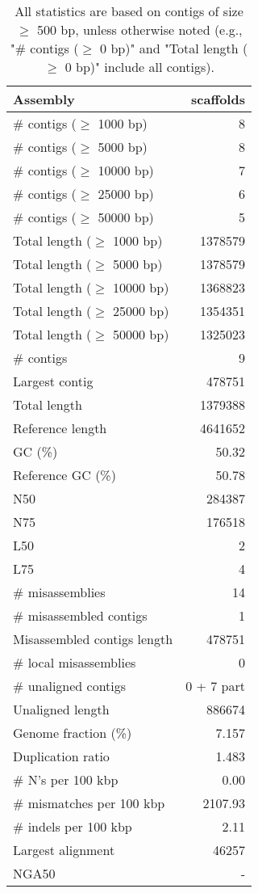 \documentclass[12pt,a4paper]{article}
\begin{document}
\begin{table}[ht]
\begin{center}
\caption{All statistics are based on contigs of size $\geq$ 500 bp, unless otherwise noted (e.g., "\# contigs ($\geq$ 0 bp)" and "Total length ($\geq$ 0 bp)" include all contigs).}
\begin{tabular}{|l*{1}{|r}|}
\hline
Assembly & scaffolds \\ \hline
\# contigs ($\geq$ 1000 bp) & 8 \\ \hline
\# contigs ($\geq$ 5000 bp) & 8 \\ \hline
\# contigs ($\geq$ 10000 bp) & 7 \\ \hline
\# contigs ($\geq$ 25000 bp) & 6 \\ \hline
\# contigs ($\geq$ 50000 bp) & 5 \\ \hline
Total length ($\geq$ 1000 bp) & 1378579 \\ \hline
Total length ($\geq$ 5000 bp) & 1378579 \\ \hline
Total length ($\geq$ 10000 bp) & 1368823 \\ \hline
Total length ($\geq$ 25000 bp) & 1354351 \\ \hline
Total length ($\geq$ 50000 bp) & 1325023 \\ \hline
\# contigs & 9 \\ \hline
Largest contig & 478751 \\ \hline
Total length & 1379388 \\ \hline
Reference length & 4641652 \\ \hline
GC (\%) & 50.32 \\ \hline
Reference GC (\%) & 50.78 \\ \hline
N50 & 284387 \\ \hline
N75 & 176518 \\ \hline
L50 & 2 \\ \hline
L75 & 4 \\ \hline
\# misassemblies & 14 \\ \hline
\# misassembled contigs & 1 \\ \hline
Misassembled contigs length & 478751 \\ \hline
\# local misassemblies & 0 \\ \hline
\# unaligned contigs & 0 + 7 part \\ \hline
Unaligned length & 886674 \\ \hline
Genome fraction (\%) & 7.157 \\ \hline
Duplication ratio & 1.483 \\ \hline
\# N's per 100 kbp & 0.00 \\ \hline
\# mismatches per 100 kbp & 2107.93 \\ \hline
\# indels per 100 kbp & 2.11 \\ \hline
Largest alignment & 46257 \\ \hline
NGA50 & - \\ \hline
\end{tabular}
\end{center}
\end{table}
\end{document}
